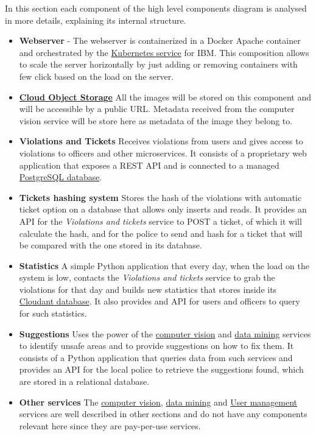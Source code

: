 In this section each component of the high level components diagram is analysed in more details, explaining
its internal structure.

\begin{itemize}
    \item \textbf{Webserver} - 
    The webserver is containerized in a Docker Apache container and orchestrated by the \hyperlink{kubernetes}{Kubernetes service} for IBM.
    This composition allows to scale the server horizontally by just adding or removing containers with few click based on the load on the server.

    \item \hyperlink{cloudObjectStorage}{\textbf{Cloud Object Storage}}
    All the images will be stored on this component and will be accessible by a public URL. Metadata received from the computer vision service will be store here as metadata of the image they belong to.

    \item \textbf{Violations and Tickets}
    Receives violations from users and gives access to violations to officers and other microservices. It consists of a proprietary web application that exposes a REST API and is connected to a managed \hyperlink{postgres}{PostgreSQL database}.

    \item \textbf{Tickets hashing system}
    Stores the hash of the violations with automatic ticket option on a database that allows only inserts and reads.
    It provides an API for the \textit{Violations and tickets} service to POST a ticket, of which it will calculate the hash,
    and for the police to send and hash for a ticket that will be compared with the one stored in its database.

    \item \textbf{Statistics}
    A simple Python application that every day, when the load on the system is low, contacts the \textit{Violations and tickets} service to grab the violations for that day and builds new statistics that stores inside its \hyperlink{cloudant}{Cloudant database}.
    It also provides and API for users and officers to query for such statistics.

    \item \textbf{Suggestions}
    Uses the power of the \hyperlink{watson}{computer vision} and \hyperlink{discovery}{data mining} services to identify unsafe areas and to provide
    suggestions on how to fix them. It consists of a Python application that queries data from such services and provides an API for the local police to retrieve the
    suggestions found, which are stored in a relational database.

    \item \textbf{Other services}
    The \hyperlink{watson}{computer vision}, \hyperlink{discovery}{data mining} and \hyperlink{appid}{User management} services are well described in other sections and do not have any components relevant here since they are pay-per-use services.
\end{itemize}